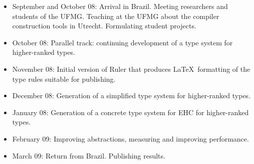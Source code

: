 \documentclass[a4paper]{article}
\begin{document}
\begin{itemize}
\item September and October 08: Arrival in Brazil. Meeting researchers and students of the UFMG. Teaching at the UFMG about the compiler construction tools in Utrecht. Formulating student projects.
\item October 08: Parallel track: continuing development of a type system for higher-ranked types.
\item November 08: Initial version of Ruler that produces \LaTeX~formatting of the type rules suitable for publishing.
\item December 08: Generation of a simplified type system for higher-ranked types.
\item January 08: Generation of a concrete type system for EHC for higher-ranked types.
\item February 09: Improving abstractions, measuring and improving performance.
\item March 09: Return from Brazil. Publishing results.
\end{itemize}
\end{document}
